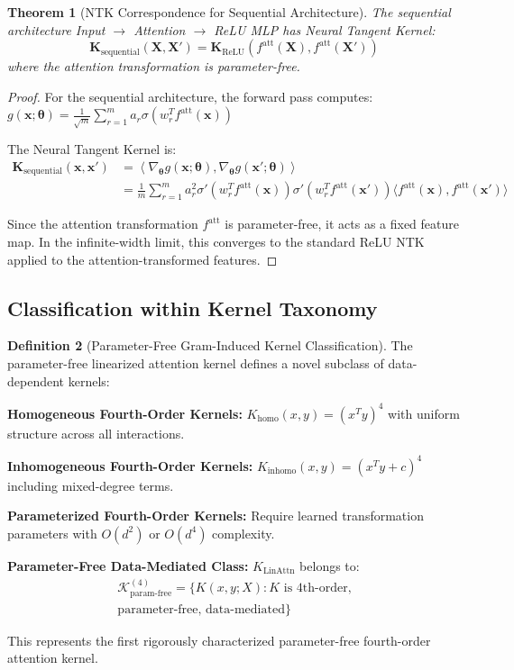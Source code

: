 \documentclass{article}
\theoremstyle{plain}
\newtheorem{theorem}{Theorem}[section]
\theoremstyle{definition}
\newtheorem{definition}[theorem]{Definition}
\theoremstyle{remark}
\begin{document}
\begin{theorem}[NTK Correspondence for Sequential Architecture]
The sequential architecture Input $\to$ Attention $\to$ ReLU MLP has Neural Tangent Kernel:
$$\mathbf{K}_{\text{sequential}}(\mathbf{X}, \mathbf{X}') = \mathbf{K}_{\text{ReLU}}(f^{\text{att}}(\mathbf{X}), f^{\text{att}}(\mathbf{X}'))$$
where the attention transformation is parameter-free.
\end{theorem}

\begin{proof}
For the sequential architecture, the forward pass computes:
$g(\mathbf{x}; \boldsymbol{\theta}) = \frac{1}{\sqrt{m}} \sum_{r=1}^m a_r \sigma(w_r^T f^{\text{att}}(\mathbf{x}))$

The Neural Tangent Kernel is:
\begin{align}
\mathbf{K}_{\text{sequential}}(\mathbf{x}, \mathbf{x}') &= \left\langle \nabla_{\boldsymbol{\theta}} g(\mathbf{x}; \boldsymbol{\theta}), \nabla_{\boldsymbol{\theta}} g(\mathbf{x}'; \boldsymbol{\theta}) \right\rangle \nonumber \\
&= \frac{1}{m} \sum_{r=1}^m a_r^2 \sigma'(w_r^T f^{\text{att}}(\mathbf{x})) \sigma'(w_r^T f^{\text{att}}(\mathbf{x}')) \langle f^{\text{att}}(\mathbf{x}), f^{\text{att}}(\mathbf{x}') \rangle
\end{align}

Since the attention transformation $f^{\text{att}}$ is parameter-free, it acts as a fixed feature map. In the infinite-width limit, this converges to the standard ReLU NTK applied to the attention-transformed features.
\end{proof}

\subsection{Classification within Kernel Taxonomy}

\begin{definition}[Parameter-Free Gram-Induced Kernel Classification]
The parameter-free linearized attention kernel defines a novel subclass of data-dependent kernels:

\textbf{Homogeneous Fourth-Order Kernels:} $K_{\text{homo}}(x,y) = (x^T y)^4$ with uniform structure across all interactions.

\textbf{Inhomogeneous Fourth-Order Kernels:} $K_{\text{inhomo}}(x,y) = (x^T y + c)^4$ including mixed-degree terms.

\textbf{Parameterized Fourth-Order Kernels:} Require learned transformation parameters with $O(d^2)$ or $O(d^4)$ complexity.

\textbf{Parameter-Free Data-Mediated Class:} $K_{\text{LinAttn}}$ belongs to:
\begin{multline*}
\mathcal{K}_{\text{param-free}}^{(4)} = \{K(x,y;X) : K \text{ is 4th-order,} \\
\text{parameter-free, data-mediated}\}
\end{multline*}

This represents the first rigorously characterized parameter-free fourth-order attention kernel.
\end{definition}
\end{document}
